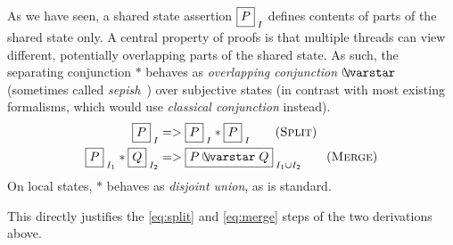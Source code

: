 As we have seen, a shared state assertion $\shared{P}{I}$ defines
contents of parts of the shared state only. A central property of
\colosl proofs is that multiple threads can view different,
potentially overlapping parts of the shared state. As such, the
separating conjunction $*$ behaves as \emph{overlapping conjunction}
$\sepish$~\cite{rey-slnotes,ramification} (sometimes called
\emph{sepish}~\cite{gareth-js12}) over subjective states (in contrast
with most existing formalisms, which would use \emph{classical
  conjunction} instead).
\begin{align*}
  \shared{P}{I} &=> \shared{P}{I} * \shared{P}{I}
  \tag{\textsc{Split}}\label{eq:split}\\
  \shared{P}{I_1} * \shared{Q}{I_2} &=> \shared{P \sepish Q}{I_1\cup I_2} \tag{\textsc{Merge}}\label{eq:merge}
\end{align*}
On local states, $*$ behaves as \emph{disjoint union}, as is standard.


This directly justifies the \eqref{eq:split} and \eqref{eq:merge}
steps of the two derivations above.


